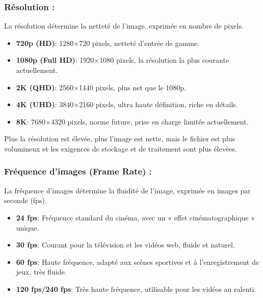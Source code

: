 


\subsubsection*{Résolution :}

La résolution détermine la netteté de l'image, exprimée en nombre de pixels.

\begin{itemize}
  \item \textbf{720p (HD)}: 1280×720 pixels, netteté d'entrée de gamme.
  \item \textbf{1080p (Full HD)}: 1920×1080 pixels, la résolution la plus courante actuellement.
  \item \textbf{2K (QHD)}: 2560×1440 pixels, plus net que le 1080p.
  \item \textbf{4K (UHD)}: 3840×2160 pixels, ultra haute définition, riche en détails.
  \item \textbf{8K}: 7680×4320 pixels, norme future, prise en charge limitée actuellement.
\end{itemize}

Plus la résolution est élevée, plus l'image est nette, mais le fichier est plus volumineux et les exigences de stockage et de traitement sont plus élevées.

\subsubsection*{Fréquence d'images (Frame Rate) :}

La fréquence d'images détermine la fluidité de l'image, exprimée en images par seconde (fps).

\begin{itemize}
  \item \textbf{24 fps}: Fréquence standard du cinéma, avec un « effet cinématographique » unique.
  \item \textbf{30 fps}: Courant pour la télévision et les vidéos web, fluide et naturel.
  \item \textbf{60 fps}: Haute fréquence, adapté aux scènes sportives et à l'enregistrement de jeux, très fluide.
  \item \textbf{120 fps/240 fps}: Très haute fréquence, utilisable pour les vidéos au ralenti.
\end{itemize}


